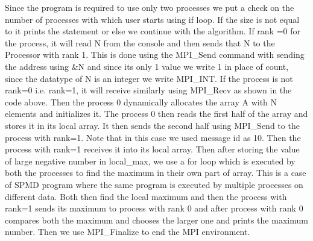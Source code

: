 \documentclass[12pt]{article}
\begin{document}
Since the program is required to use only two processes we put a check on the number of processes with which user starts using if loop. If the size is not equal to it prints the statement or else we continue with the algorithm. If rank =0 for the process, it will read N from the console and then sends that N to the Processor with rank 1. This is done using the MPI\_Send command with sending the address using \&N and since its only 1 value we write 1 in place of count, since the datatype of N is an integer we write MPI\_INT. If the process is not rank=0 i.e. rank=1, it will receive similarly using MPI\_Recv as shown in the code above. Then the process 0 dynamically allocates the array A with N elements and initializes it. The process 0 then reads the first half of the array and stores it in its local array. It then sends the second half using MPI\_Send to the process with rank=1. Note that in this case we used message id as 10. Then the process with rank=1 receives it into its local array. 
Then after storing the value of large negative number in local\_max, we use a for loop which is executed by both the processes to find the maximum in their own part of array. This is a case of SPMD program where the same program is executed by multiple processes on different data. Both then find the local maximum and then the process with rank=1 sends its maximum to process with rank 0 and after process with rank 0 compares both the maximum and chooses the larger one and prints the maximum number. Then we use MPI\_Finalize to end the MPI environment.
\end{document}
